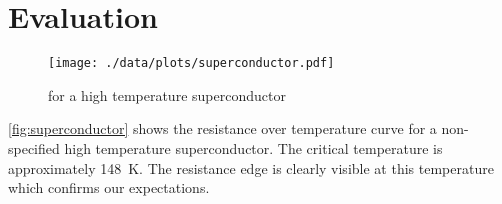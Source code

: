 \section{Evaluation}
\begin{figure}[tbp]
	\centering
	\texttt{[image: ./data/plots/superconductor.pdf]}
	\caption[Superconductivity: Resistance over temperature]{ for a high temperature superconductor}
	\label{fig:superconductor}
\end{figure}
\autoref{fig:superconductor} shows the resistance over temperature curve for a non-specified high temperature superconductor.
The critical temperature is approximately \SI{148}{\kelvin}.
The resistance edge is clearly visible at this temperature which confirms our expectations.
